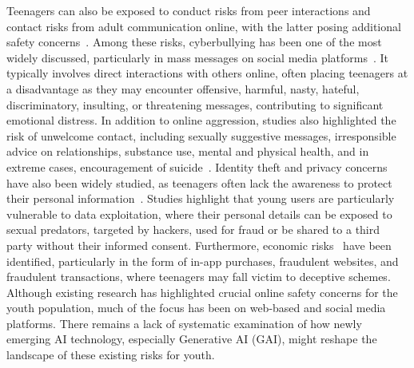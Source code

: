 Teenagers can also be exposed to conduct risks from peer interactions and contact risks from adult communication online, with the latter posing additional safety concerns~\cite{livingstone2008risky}.
Among these risks, cyberbullying has been one of the most widely discussed, particularly in mass messages on social media platforms~\cite{mascheroni2014net, livingstone2011risks, livingstone2008risky, jones2013online, freed2023understanding}. It typically involves direct interactions with others online, often placing teenagers at a disadvantage as they may encounter offensive, harmful, nasty, hateful, discriminatory, insulting, or threatening messages, contributing to significant emotional distress.
In addition to online aggression, studies also highlighted the risk of unwelcome contact, including sexually suggestive messages, irresponsible advice on relationships, substance use, mental and physical health, and in extreme cases, encouragement of suicide~\cite{tsirtsis2016cyber, freed2023understanding}.
Identity theft and privacy concerns have also been widely studied, as teenagers often lack the awareness to protect their personal information~\cite{staksrud2013does, mascheroni2014net, tsirtsis2016cyber, andries2023alexa, freed2023understanding}. Studies highlight that young users are particularly vulnerable to data exploitation, where their personal details can be exposed to sexual predators, targeted by hackers, used for fraud or be shared to a third party without their informed consent. 
Furthermore, economic risks~\cite{tsirtsis2016cyber, freed2023understanding} have been identified, particularly in the form of in-app purchases, fraudulent websites, and fraudulent transactions, where teenagers may fall victim to deceptive schemes. 
Although existing research has highlighted crucial online safety concerns for the youth population, much of the focus has been on web-based and social media platforms. There remains a lack of systematic examination of how newly emerging AI technology, especially Generative AI (GAI), might reshape the landscape of these existing risks for youth.

\vspace{-8pt}
